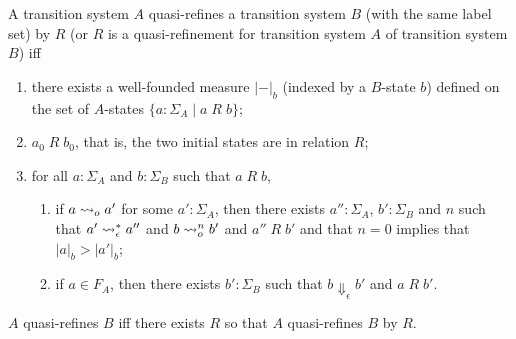 \begin{definition} \label{def-quasi-refine}
  A transition system $A$ quasi-refines a transition system $B$ (with the same label set) by $R$ (or $R$ is a quasi-refinement for transition system $A$ of transition system $B$) iff
  \begin{enumerate}
  \item there exists a well-founded measure $|-|_b$ (indexed by a $B$-state $b$) defined on the set of $A$-states $\{a:\Sigma_A\;|\;a\;R\;b\}$;
  \item $a_0\;R\;b_0$, that is, the two initial states are in  relation $R$;
  \item for all $a:\Sigma_A$ and $b:\Sigma_B$ such that $a\;R\;b$,
    \begin{enumerate}
    \item if $a\leadsto_o a'$ for some $a':\Sigma_A$, then there exists $a'':\Sigma_A$, $b':\Sigma_B$ and $n$ such that $a'\leadsto^*_\epsilon a''$ and $b\leadsto^n_o b'$ and $a''\;R\;b'$ and that $n=0$ implies that $|a|_b>|a'|_b$;
    \item if $a\in F_A$, then there exists $b':\Sigma_B$ such that $b\Downarrow_\epsilon b'$ and $a\;R\;b'$.
    \end{enumerate}
  \end{enumerate}
  $A$ quasi-refines $B$ iff there exists $R$ so that $A$ quasi-refines $B$ by $R$.
\end{definition}

